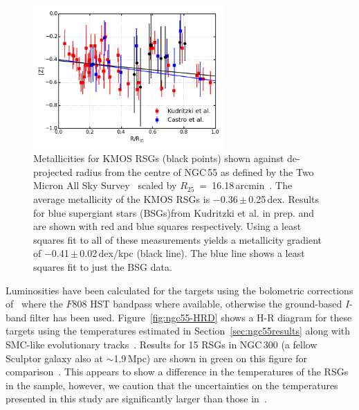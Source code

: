 \begin{figure}
 \centering
 \includegraphics[width=0.65\textwidth]{ngc55/NGC55-ZvsR-BSGs}
 \caption[Metallicities for KMOS targets shown against de-projected radius]{
 Metallicities for KMOS RSGs (black points) shown against de-projected radius from the centre of NGC\,55 as defined by the Two Micron All Sky Survey~\citep{2006AJ....131.1163S} scaled by $R_{25}$~=~16.18\,arcmin~\citep{2004AJ....127.2031K}.
 The average metallicity of the KMOS RSGs is $-$0.36\,$\pm$\,0.25\,dex.
 Results for blue supergiant stars (BSGs)from Kudritzki et al. in prep. and~\citep{2012A&A...542A..79C} are shown with red and blue squares respectively.
Using a least squares fit to all of these measurements yields a metallicity gradient of $-$0.41\,$\pm$\,0.02\,dex/kpc (black line).
The blue line shows a least squares fit to just the BSG data.
 }
 \label{fig:ngc55ZvsR}
\end{figure}

Luminosities have been calculated for the targets using the bolometric corrections of~\citet{2013ApJ...767....3D} where the $F808$ HST bandpass where available,
otherwise the ground-based $I$-band filter has been used.
Figure~\ref{fig:ngc55-HRD} shows a H-R diagram for these targets using the temperatures estimated in Section~\ref{sec:ngc55results} along with SMC-like evolutionary tracks~\citep{2013A&A...558A.103G}.
Results for 15 RSGs in NGC\,300 (a fellow Sculptor galaxy also at $\sim$1.9\,Mpc) are shown in green on this figure for comparison~\citep{2015ApJ...805..182G}.
This appears to show a difference in the temperatures of the RSGs in the sample, however, we caution that the uncertainties on the temperatures presented in this study are significantly larger than those in~\citet{2015ApJ...805..182G}.

